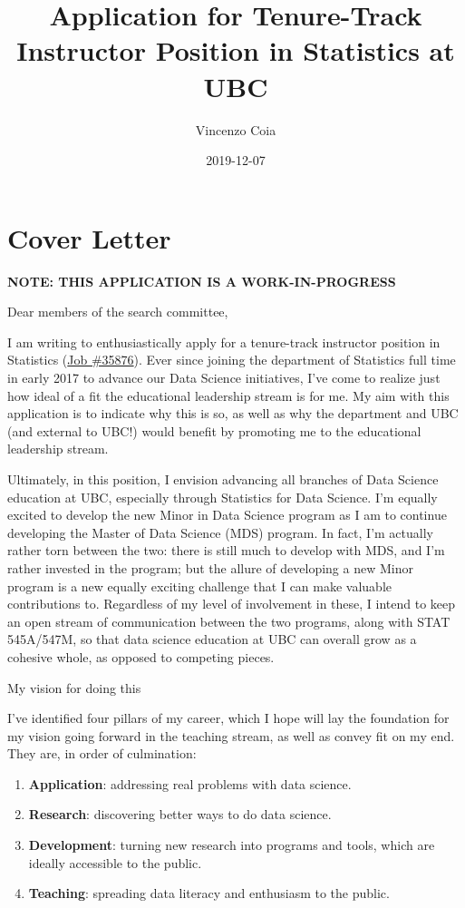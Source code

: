 \documentclass[]{book}
\title{Application for Tenure-Track Instructor Position in Statistics at UBC}
\author{Vincenzo Coia}
\date{2019-12-07}
\begin{document}
\maketitle

{
\setcounter{tocdepth}{1}
\tableofcontents
}
\hypertarget{cover-letter}{%
\chapter{Cover Letter}\label{cover-letter}}

\textbf{NOTE: THIS APPLICATION IS A WORK-IN-PROGRESS}

Dear members of the search committee,

I am writing to enthusiastically apply for a tenure-track instructor position in Statistics (\href{https://www.stat.ubc.ca/three-tenure-track-instructor-positions-statistics-35876}{Job \#35876}). Ever since joining the department of Statistics full time in early 2017 to advance our Data Science initiatives, I've come to realize just how ideal of a fit the educational leadership stream is for me. My aim with this application is to indicate why this is so, as well as why the department and UBC (and external to UBC!) would benefit by promoting me to the educational leadership stream.

Ultimately, in this position, I envision advancing all branches of Data Science education at UBC, especially through Statistics for Data Science. I'm equally excited to develop the new Minor in Data Science program as I am to continue developing the Master of Data Science (MDS) program. In fact, I'm actually rather torn between the two: there is still much to develop with MDS, and I'm rather invested in the program; but the allure of developing a new Minor program is a new equally exciting challenge that I can make valuable contributions to. Regardless of my level of involvement in these, I intend to keep an open stream of communication between the two programs, along with STAT 545A/547M, so that data science education at UBC can overall grow as a cohesive whole, as opposed to competing pieces.

My vision for doing this

I've identified four pillars of my career, which I hope will lay the foundation for my vision going forward in the teaching stream, as well as convey fit on my end. They are, in order of culmination:

\begin{enumerate}
\def\labelenumi{\arabic{enumi}.}
\item
  \textbf{Application}: addressing real problems with data science.
\item
  \textbf{Research}: discovering better ways to do data science.
\item
  \textbf{Development}: turning new research into programs and tools, which are ideally accessible to the public.
\item
  \textbf{Teaching}: spreading data literacy and enthusiasm to the public.
\end{enumerate}
\end{document}
